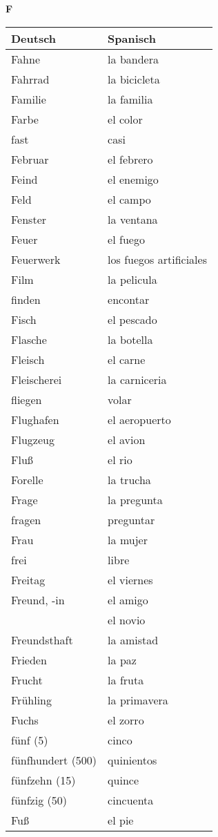 \begin{flushright}\begin{Huge}\textbf{F}\end{Huge}\end{flushright}

\begin{longtable}{p{} p{}} 
\textbf{Deutsch}     & \textbf{Spanisch}                                       \\ \hline
\hline
\endhead %
Fahne & la bandera\\
Fahrrad & la bicicleta\\
Familie & la familia\\
Farbe & el color\\
fast & casi \\
Februar & el febrero\\
Feind & el enemigo\\
Feld & el campo\\
Fenster & la ventana\\
Feuer & el fuego\\
Feuerwerk & los fuegos artificiales\\
Film & la pelicula\\
finden & encontar\\
Fisch & el pescado\\
Flasche & la botella\\
Fleisch & el carne \\
Fleischerei & la carniceria\\
fliegen & volar\\
Flughafen & el aeropuerto\\
Flugzeug & el avion\\
Fluß & el rio\\
Forelle & la trucha \\
Frage & la pregunta\\
fragen & preguntar\\
Frau & la mujer \\
frei & libre\\
Freitag & el viernes\\
Freund, -in & el amigo\\
~ & el novio\\
Freundsthaft & la amistad\\
Frieden & la paz\\
Frucht & la fruta\\
Frühling & la primavera\\
Fuchs & el zorro\\
fünf (5) & cinco \\
fünfhundert (500) & quinientos\\
fünfzehn (15) & quince\\
fünfzig (50) & cincuenta\\
Fuß & el pie\\
\end{longtable}
